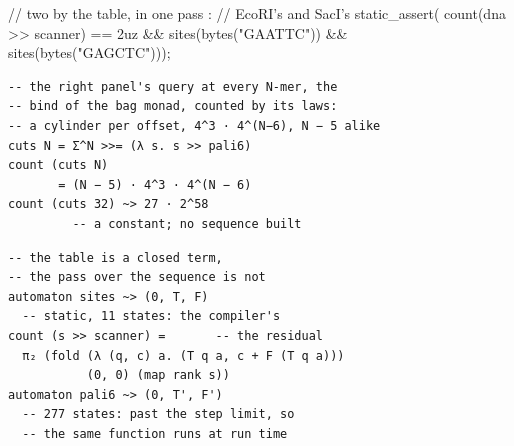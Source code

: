 \begin{listing}[htbp]
\begin{minipage}[t]{0.49\linewidth}
\begin{cpp}
// two by the table, in one pass :
// EcoRI's and SacI's
static_assert(
  count(dna >> scanner) == 2uz &&
  sites(bytes("GAATTC")) &&
  sites(bytes("GAGCTC")));
\end{cpp}
\end{minipage}
\begin{minipage}[t]{0.49\linewidth}
\begin{verbatim}
-- the right panel's query at every N-mer, the
-- bind of the bag monad, counted by its laws:
-- a cylinder per offset, 4^3 · 4^(N−6), N − 5 alike
cuts N = Σ^N >>= (λ s. s >> pali6)
count (cuts N)
       = (N − 5) · 4^3 · 4^(N − 6)
count (cuts 32) ~> 27 · 2^58
         -- a constant; no sequence built
\end{verbatim}
\end{minipage}\hfill
\begin{minipage}[t]{0.49\linewidth}
\begin{verbatim}
-- the table is a closed term,
-- the pass over the sequence is not
automaton sites ~> (0, T, F)
  -- static, 11 states: the compiler's
count (s >> scanner) =       -- the residual
  π₂ (fold (λ (q, c) a. (T q a, c + F (T q a)))
           (0, 0) (map rank s))
automaton pali6 ~> (0, T', F')
  -- 277 states: past the step limit, so
  -- the same function runs at run time
\end{verbatim}
\end{minipage}
\caption{Palindromic DNA restriction sites, counted two ways on one definition.
A palindrome is a word equal to its reverse complement, a $\theta$-palindrome for $\theta$ that antimorphic involution~\cite{kari2010watson}, as EcoRI's \texttt{GAATTC}; an enzyme cuts where one occurs.
Left: how many cuts a cocktail of every six-cutter makes in all $4^N$ $N$-mers, each digested once.
Right: the cuts of a smaller cocktail, the six-cutters beginning \texttt{GA}, in any one sequence, the caller's bytes read where they lie; here the polylinker of the plasmid pUC19.
Below each: its translation (Section~\ref{sec:translation}), a closed term the compiler reduces and a residual for the run time.
Without the count's laws, the left panel would build the $N$-mers and exhaust the step limit (Table~\ref{tab:binding}) before reaching its .
The table is Brzozowski's automaton~\cite{brzozowski1964derivatives}, for one site the matcher of Knuth, Morris and Pratt~\cite{knuth1977fast}, which partial evaluation derives~\cite{consel1989partial}.
Its cost is moved to compile time where the step limit admits: ``negative overhead abstraction''~\cite{stroustrup2026peterman}.}
\label{lst:sites}
\end{listing}
